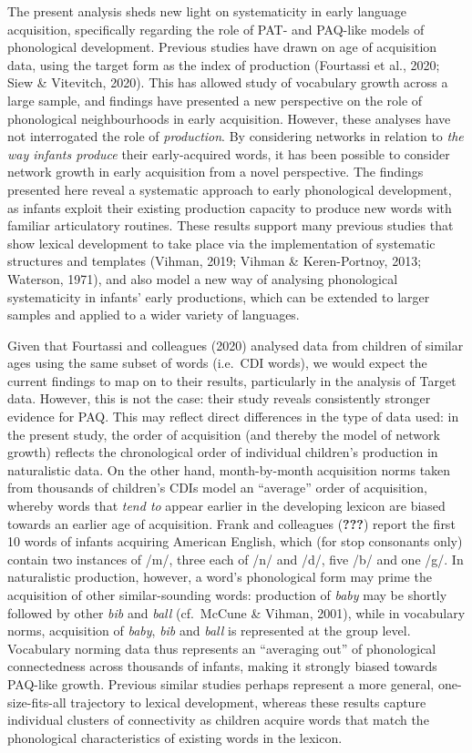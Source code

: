 \documentclass[
  english,
  man,floatsintext]{apa6}
\begin{document}
The present analysis sheds new light on systematicity in early language acquisition, specifically regarding the role of PAT- and PAQ-like models of phonological development. Previous studies have drawn on age of acquisition data, using the target form as the index of production (Fourtassi et al., 2020; Siew \& Vitevitch, 2020). This has allowed study of vocabulary growth across a large sample, and findings have presented a new perspective on the role of phonological neighbourhoods in early acquisition. However, these analyses have not interrogated the role of \emph{production}. By considering networks in relation to \emph{the way infants produce} their early-acquired words, it has been possible to consider network growth in early acquisition from a novel perspective. The findings presented here reveal a systematic approach to early phonological development, as infants exploit their existing production capacity to produce new words with familiar articulatory routines. These results support many previous studies that show lexical development to take place via the implementation of systematic structures and templates (Vihman, 2019; Vihman \& Keren-Portnoy, 2013; Waterson, 1971), and also model a new way of analysing phonological systematicity in infants' early productions, which can be extended to larger samples and applied to a wider variety of languages.

Given that Fourtassi and colleagues (2020) analysed data from children of similar ages using the same subset of words (i.e.~CDI words), we would expect the current findings to map on to their results, particularly in the analysis of Target data. However, this is not the case: their study reveals consistently stronger evidence for PAQ. This may reflect direct differences in the type of data used: in the present study, the order of acquisition (and thereby the model of network growth) reflects the chronological order of individual children's production in naturalistic data. On the other hand, month-by-month acquisition norms taken from thousands of children's CDIs model an \enquote{average} order of acquisition, whereby words that \emph{tend to} appear earlier in the developing lexicon are biased towards an earlier age of acquisition. Frank and colleagues ({\textbf{???}}) report the first 10 words of infants acquiring American English, which (for stop consonants only) contain two instances of /m/, three each of /n/ and /d/, five /b/ and one /g/. In naturalistic production, however, a word's phonological form may prime the acquisition of other similar-sounding words: production of \emph{baby} may be shortly followed by other \emph{bib} and \emph{ball} (cf.~McCune \& Vihman, 2001), while in vocabulary norms, acquisition of \emph{baby}, \emph{bib} and \emph{ball} is represented at the group level. Vocabulary norming data thus represents an \enquote{averaging out} of phonological connectedness across thousands of infants, making it strongly biased towards PAQ-like growth. Previous similar studies perhaps represent a more general, one-size-fits-all trajectory to lexical development, whereas these results capture individual clusters of connectivity as children acquire words that match the phonological characteristics of existing words in the lexicon.
\end{document}
